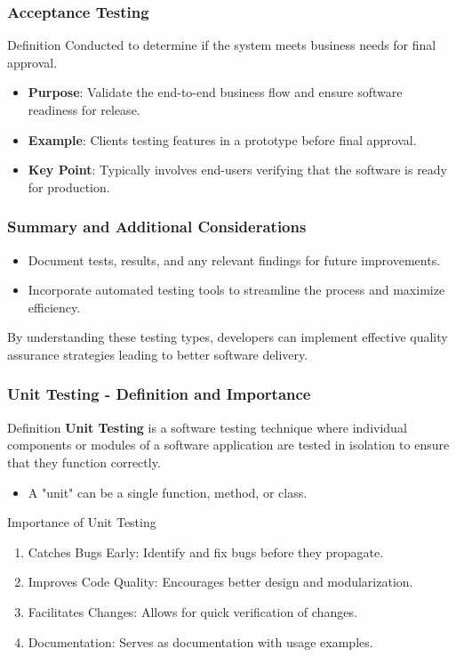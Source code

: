 \documentclass{beamer}
\begin{document}
\begin{frame}[fragile]
    \frametitle{Acceptance Testing}
    \begin{block}{Definition}
        Conducted to determine if the system meets business needs for final approval.
    \end{block}
    \begin{itemize}
        \item \textbf{Purpose}: Validate the end-to-end business flow and ensure software readiness for release.
        \item \textbf{Example}: Clients testing features in a prototype before final approval.
        \item \textbf{Key Point}: Typically involves end-users verifying that the software is ready for production.
    \end{itemize}
\end{frame}

\begin{frame}[fragile]
    \frametitle{Summary and Additional Considerations}
    \begin{itemize}
        \item Document tests, results, and any relevant findings for future improvements.
        \item Incorporate automated testing tools to streamline the process and maximize efficiency.
    \end{itemize}
    By understanding these testing types, developers can implement effective quality assurance strategies leading to better software delivery.
\end{frame}

\begin{frame}[fragile]
    \frametitle{Unit Testing - Definition and Importance}
    \begin{block}{Definition}
        \textbf{Unit Testing} is a software testing technique where individual components or modules 
        of a software application are tested in isolation to ensure that they function correctly.
    \end{block}
    \begin{itemize}
        \item A "unit" can be a single function, method, or class.
    \end{itemize}

    \begin{block}{Importance of Unit Testing}
        \begin{enumerate}
            \item Catches Bugs Early: Identify and fix bugs before they propagate.
            \item Improves Code Quality: Encourages better design and modularization.
            \item Facilitates Changes: Allows for quick verification of changes.
            \item Documentation: Serves as documentation with usage examples.
        \end{enumerate}
    \end{block}
\end{frame}
\end{document}
